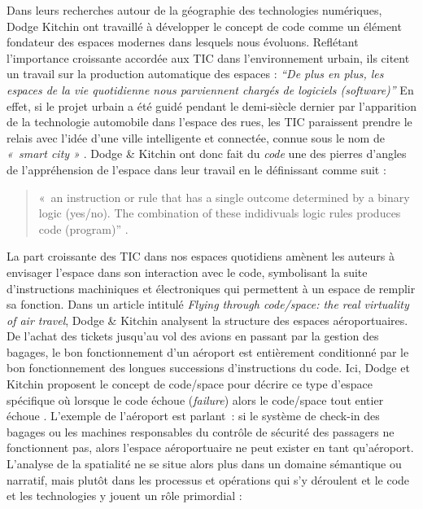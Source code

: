 Dans leurs recherches autour de la géographie des technologies numériques, Dodge  Kitchin ont travaillé à développer le concept de code comme un élément fondateur des espaces modernes dans lesquels nous évoluons. Reflétant l’importance croissante accordée aux TIC dans l’environnement urbain, ils citent un travail sur la production automatique des espaces : \textit{“De plus en plus, les espaces de la vie  quotidienne nous parviennent chargés de logiciels (software)”} \citep{Thrift2002} En effet, si le projet urbain a été guidé pendant le demi-siècle dernier par l’apparition de la technologie automobile dans l’espace des rues, les TIC paraissent prendre le relais avec l’idée d’une ville intelligente et connectée, connue sous le nom de \textit{« smart city »} \citep{Ascher2009}. Dodge \& Kitchin ont donc fait du \textit{code} une des pierres d’angles de l’appréhension de l’espace dans leur travail en le définissant comme suit : 

\begin{quote}
« an instruction or rule that has a single outcome determined by a binary logic (yes/no). The combination of these indidivuals logic rules produces code (program)” \citep{Kitchin2011}.
\end{quote}

La part croissante des TIC dans nos espaces quotidiens amènent les auteurs à envisager l’espace dans son interaction avec le code, symbolisant la suite d’instructions machiniques et électroniques qui permettent à un espace de remplir sa fonction. Dans un article intitulé \textit{Flying through code/space: the real virtuality of air travel}, Dodge \& Kitchin analysent la structure des espaces aéroportuaires. De l’achat des tickets jusqu’au vol des avions en passant par la gestion des bagages, le bon fonctionnement d’un aéroport est entièrement conditionné par le bon fonctionnement des longues successions d’instructions du code. Ici, Dodge et Kitchin proposent le concept de code/space pour décrire ce type d’espace spécifique où lorsque le code échoue (\textit{failure}) alors le code/space tout entier échoue \citep{Dodge2004}. L’exemple de l’aéroport est parlant : si le système de check-in des bagages ou les machines responsables du contrôle de sécurité des passagers ne fonctionnent pas, alors l’espace aéroportuaire ne peut exister en tant qu’aéroport. L’analyse de la spatialité ne se situe alors plus dans un domaine sémantique ou narratif, mais plutôt dans les processus et opérations qui s’y déroulent et le code et les technologies y jouent un rôle primordial : 

